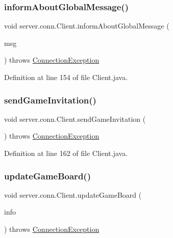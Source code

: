 \subsubsection{\texorpdfstring{inform\+About\+Global\+Message()}{informAboutGlobalMessage()}}
{\footnotesize\ttfamily void server.\+conn.\+Client.\+inform\+About\+Global\+Message (\begin{DoxyParamCaption}\item[{\hyperlink{classsharedlib_1_1tuples_1_1_message}{Message}}]{msg }\end{DoxyParamCaption}) throws \hyperlink{classsharedlib_1_1exceptions_1_1_connection_exception}{Connection\+Exception}}



Definition at line 154 of file Client.\+java.

\hypertarget{classserver_1_1conn_1_1_client_aec42adfdb88bb9420e3e64a9438d5b2f}{}\label{classserver_1_1conn_1_1_client_aec42adfdb88bb9420e3e64a9438d5b2f} 
\subsubsection{\texorpdfstring{send\+Game\+Invitation()}{sendGameInvitation()}}
{\footnotesize\ttfamily void server.\+conn.\+Client.\+send\+Game\+Invitation (\begin{DoxyParamCaption}{ }\end{DoxyParamCaption}) throws \hyperlink{classsharedlib_1_1exceptions_1_1_connection_exception}{Connection\+Exception}}



Definition at line 162 of file Client.\+java.

\hypertarget{classserver_1_1conn_1_1_client_a3f453d2e735012e76fae03f9e2b16042}{}\label{classserver_1_1conn_1_1_client_a3f453d2e735012e76fae03f9e2b16042} 
\subsubsection{\texorpdfstring{update\+Game\+Board()}{updateGameBoard()}}
{\footnotesize\ttfamily void server.\+conn.\+Client.\+update\+Game\+Board (\begin{DoxyParamCaption}\item[{\hyperlink{classsharedlib_1_1tuples_1_1_board_info}{Board\+Info}}]{info }\end{DoxyParamCaption}) throws \hyperlink{classsharedlib_1_1exceptions_1_1_connection_exception}{Connection\+Exception}}



